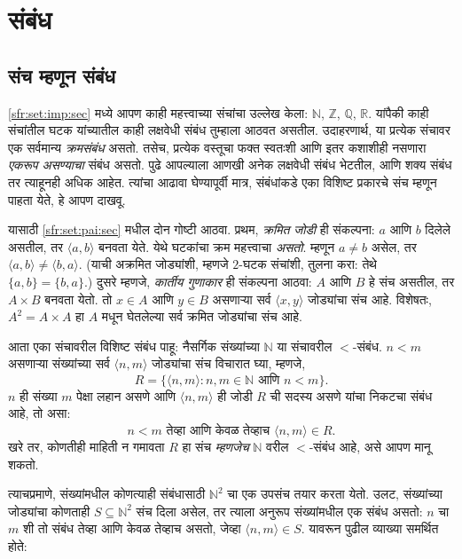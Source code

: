 \documentclass[11pt,a4paper,openany]{book}
\theoremstyle{definition}
\newenvironment{explain}{}{}
\newcommand{\Setabs}[2]{\{#1:#2\}}
\newcommand{\tuple}[1]{\langle #1\rangle}
\newcommand{\Nat}{\mathbb{N}}
\newcommand{\Int}{\mathbb{Z}}
\newcommand{\Rat}{\mathbb{Q}}
\newcommand{\Real}{\mathbb{R}}
\begin{document}
\chapter{संबंध}\label{sfr:rel::chap}








\section{संच म्हणून संबंध}\label{sfr:rel:set:sec}

\begin{explain}
\ref{sfr:set:imp:sec} मध्ये आपण काही महत्त्वाच्या संचांचा उल्लेख केला:
$\Nat$, $\Int$, $\Rat$, $\Real$. यांपैकी काही संचांतील घटक
यांच्यातील काही लक्षवेधी संबंध तुम्हाला आठवत असतील. उदाहरणार्थ, या प्रत्येक
संचावर एक सर्वमान्य \emph{क्रमसंबंध} असतो. तसेच, प्रत्येक वस्तूचा फक्त
स्वतःशी आणि इतर कशाशीही नसणारा \emph{एकरूप असण्याचा} संबंध असतो. पुढे
आपल्याला आणखी अनेक लक्षवेधी संबंध भेटतील, आणि शक्य संबंध तर त्याहूनही
अधिक आहेत. त्यांचा आढावा घेण्यापूर्वी मात्र, संबंधांकडे एका विशिष्ट प्रकारचे
संच म्हणून पाहता येते, हे आपण दाखवू.

यासाठी \ref{sfr:set:pai:sec} मधील दोन गोष्टी आठवा. प्रथम,
\emph{क्रमित जोडी} ही संकल्पना: $a$ आणि $b$ दिलेले असतील, तर
$\tuple{a, b}$ बनवता येते. येथे घटकांचा क्रम महत्त्वाचा \emph{असतो}.
म्हणून $a \neq b$ असेल, तर $\tuple{a, b} \neq \tuple{b, a}$.
(याची अक्रमित जोड्यांशी, म्हणजे $2$-घटक संचांशी, तुलना करा: तेथे
$\{a, b\}=\{b, a\}$.) दुसरे म्हणजे, \emph{कार्तीय गुणाकार} ही संकल्पना
आठवा: $A$ आणि $B$ हे संच असतील, तर $A \times B$ बनवता येतो. तो
$x \in A$ आणि $y \in B$ असणाऱ्या सर्व $\tuple{x, y}$ जोड्यांचा संच
आहे. विशेषतः, $A^{2}= A \times A$ हा $A$ मधून घेतलेल्या सर्व क्रमित
जोड्यांचा संच आहे.

आता एका संचावरील विशिष्ट संबंध पाहू: नैसर्गिक संख्यांच्या $\Nat$ या
संचावरील $<$-संबंध. $n<m$ असणाऱ्या संख्यांच्या सर्व $\tuple{n, m}$
जोड्यांचा संच विचारात घ्या, म्हणजे,
\[
  R=\Setabs{\tuple{n, m}}{n, m \in \Nat \text{ आणि } n<m}.
\]
$n$ ही संख्या $m$ पेक्षा लहान असणे आणि $\tuple{n, m}$ ही जोडी
$R$ ची सदस्य असणे यांचा निकटचा संबंध आहे, तो असा:
\[
      n<m\text{ तेव्हा आणि केवळ तेव्हाच }\tuple{n, m} \in R.
\]
खरे तर, कोणतीही माहिती न गमावता $R$ हा संच \emph{म्हणजेच} $\Nat$
वरील $<$-संबंध आहे, असे आपण मानू शकतो.

त्याचप्रमाणे, संख्यांमधील कोणत्याही संबंधासाठी $\Nat^{2}$ चा एक उपसंच
तयार करता येतो. उलट, संख्यांच्या जोड्यांचा कोणताही $S \subseteq \Nat^{2}$
संच दिला असेल, तर त्याला अनुरूप संख्यांमधील एक संबंध असतो: $n$ चा $m$
शी तो संबंध तेव्हा आणि केवळ तेव्हाच असतो, जेव्हा $\tuple{n, m} \in S$.
यावरून पुढील व्याख्या समर्थित होते:
\end{explain}
\end{document}

